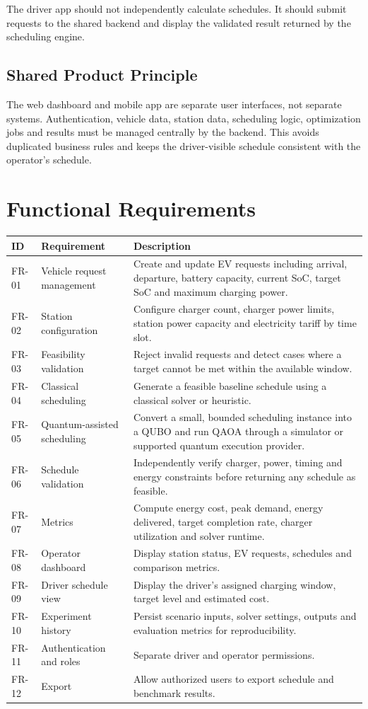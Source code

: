 \documentclass[11pt,a4paper]{article}
\begin{document}
The driver app should not independently calculate schedules. It should submit requests to the shared backend and display the validated result returned by the scheduling engine.

\subsection{Shared Product Principle}

The web dashboard and mobile app are separate user interfaces, not separate systems. Authentication, vehicle data, station data, scheduling logic, optimization jobs and results must be managed centrally by the backend. This avoids duplicated business rules and keeps the driver-visible schedule consistent with the operator's schedule.

\section{Functional Requirements}

\begin{longtable}{p{1.2cm}p{4.0cm}p{8.0cm}}
\toprule
\textbf{ID} & \textbf{Requirement} & \textbf{Description} \\
\midrule
FR-01 & Vehicle request management & Create and update EV requests including arrival, departure, battery capacity, current SoC, target SoC and maximum charging power. \\
FR-02 & Station configuration & Configure charger count, charger power limits, station power capacity and electricity tariff by time slot. \\
FR-03 & Feasibility validation & Reject invalid requests and detect cases where a target cannot be met within the available window. \\
FR-04 & Classical scheduling & Generate a feasible baseline schedule using a classical solver or heuristic. \\
FR-05 & Quantum-assisted scheduling & Convert a small, bounded scheduling instance into a QUBO and run QAOA through a simulator or supported quantum execution provider. \\
FR-06 & Schedule validation & Independently verify charger, power, timing and energy constraints before returning any schedule as feasible. \\
FR-07 & Metrics & Compute energy cost, peak demand, energy delivered, target completion rate, charger utilization and solver runtime. \\
FR-08 & Operator dashboard & Display station status, EV requests, schedules and comparison metrics. \\
FR-09 & Driver schedule view & Display the driver's assigned charging window, target level and estimated cost. \\
FR-10 & Experiment history & Persist scenario inputs, solver settings, outputs and evaluation metrics for reproducibility. \\
FR-11 & Authentication and roles & Separate driver and operator permissions. \\
FR-12 & Export & Allow authorized users to export schedule and benchmark results. \\
\bottomrule
\end{longtable}
\end{document}
